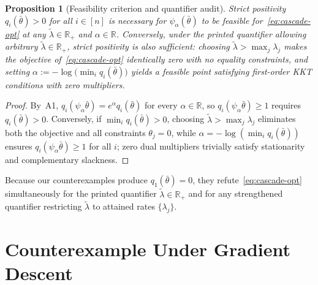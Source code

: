 \documentclass[11pt]{article}
\theoremstyle{plain}
\newtheorem{proposition}[theorem]{Proposition}
\theoremstyle{definition}
\theoremstyle{remark}
\begin{document}
\begin{proposition}[Feasibility criterion and quantifier audit]\label{prop:quantifier}
Strict positivity $q_i(\bar{\theta}) > 0$ for all $i \in [n]$ is necessary for $\psi_\alpha(\bar{\theta})$ to be feasible for~\eqref{eq:cascade-opt} at any $\tilde{\lambda} \in \mathbb{R}_+$ and $\alpha \in \mathbb{R}$. Conversely, under the printed quantifier allowing arbitrary $\tilde{\lambda} \in \mathbb{R}_+$, strict positivity is also sufficient: choosing $\tilde{\lambda} > \max_j \lambda_j$ makes the objective of~\eqref{eq:cascade-opt} identically zero with no equality constraints, and setting $\alpha := -\log\bigl(\min_i q_i(\bar{\theta})\bigr)$ yields a feasible point satisfying first-order KKT conditions with zero multipliers.
\end{proposition}

\begin{proof}
By~A1, $q_i(\psi_\alpha \bar{\theta}) = e^\alpha q_i(\bar{\theta})$ for every $\alpha \in \mathbb{R}$, so $q_i(\psi_\alpha \bar{\theta}) \ge 1$ requires $q_i(\bar{\theta}) > 0$. Conversely, if $\min_i q_i(\bar{\theta}) > 0$, choosing $\tilde{\lambda} > \max_j \lambda_j$ eliminates both the objective and all constraints $\theta_j = 0$, while $\alpha = -\log(\min_i q_i(\bar{\theta}))$ ensures $q_i(\psi_\alpha \bar{\theta}) \ge 1$ for all $i$; zero dual multipliers trivially satisfy stationarity and complementary slackness.
\end{proof}

Because our counterexamples produce $q_1(\bar{\theta}) = 0$, they refute~\eqref{eq:cascade-opt} simultaneously for the printed quantifier $\tilde{\lambda} \in \mathbb{R}_+$ and for any strengthened quantifier restricting $\tilde{\lambda}$ to attained rates $\{\lambda_j\}$.

\section{Counterexample Under Gradient Descent}
\end{document}
